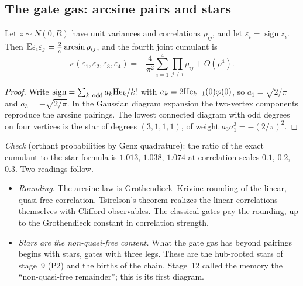 \subsection{The gate gas: arcsine pairs and stars}
\begin{proposition}\label{prop:stars}
Let $z\sim N(0,R)$ have unit variances and correlations $\rho_{ij}$, and let $\varepsilon_i=\operatorname{sign}z_i$. Then
$\mathbb E\varepsilon_i\varepsilon_j=\frac2\pi\arcsin\rho_{ij}$, and the fourth joint cumulant is
\[
\kappa(\varepsilon_1,\varepsilon_2,\varepsilon_3,\varepsilon_4)=-\frac4{\pi^2}\sum_{i=1}^4\prod_{j\ne i}\rho_{ij}+O(\rho^4).
\]
\end{proposition}
\begin{proof}
Write $\operatorname{sign}=\sum_{k\ \rm odd}a_k\mathrm{He}_k/k!$ with $a_k=2\mathrm{He}_{k-1}(0)\varphi(0)$, so $a_1=\sqrt{2/\pi}$ and $a_3=-\sqrt{2/\pi}$. In the
Gaussian diagram expansion the two-vertex components reproduce the arcsine pairings. The lowest connected diagram with odd degrees on
four vertices is the star of degrees $(3,1,1,1)$, of weight $a_3a_1^3=-(2/\pi)^2$.
\end{proof}
\emph{Check} (orthant probabilities by Genz quadrature): the ratio of the exact cumulant to the star formula is $1.013$, $1.038$, $1.074$
at correlation scales $0.1$, $0.2$, $0.3$. Two readings follow.
\begin{itemize}[leftmargin=*]
\item \emph{Rounding.} The arcsine law is Grothendieck--Krivine rounding of the linear, quasi-free correlation. Tsirelson's theorem
realizes the linear correlations themselves with Clifford observables. The classical gates pay the rounding, up to the Grothendieck
constant in correlation strength.
\item \emph{Stars are the non-quasi-free content.} What the gate gas has beyond pairings begins with stars, gates with three legs. These
are the hub-rooted stars of stage~9 (P2) and the births of the chain. Stage~12 called the memory the ``non-quasi-free remainder''; this
is its first diagram.
\end{itemize}

